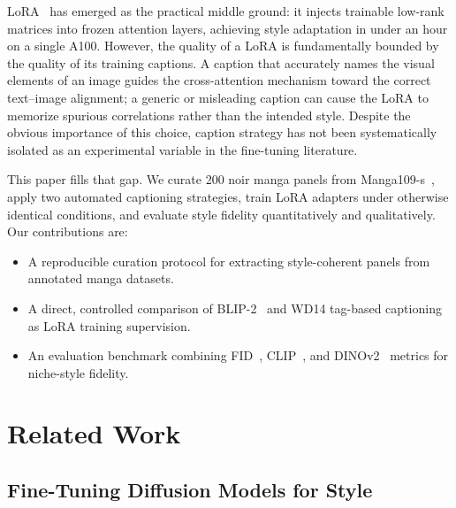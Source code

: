 \documentclass[10pt,twocolumn,letterpaper]{article}
\begin{document}
LoRA~\cite{hu2021lora} has emerged as the practical middle ground: it injects trainable low-rank matrices into frozen attention layers, achieving style adaptation in under an hour on a single A100.
However, the quality of a LoRA is fundamentally bounded by the quality of its training captions.
A caption that accurately names the visual elements of an image guides the cross-attention mechanism toward the correct text–image alignment; a generic or misleading caption can cause the LoRA to memorize spurious correlations rather than the intended style.
Despite the obvious importance of this choice, caption strategy has not been systematically isolated as an experimental variable in the fine-tuning literature.

This paper fills that gap.
We curate 200 noir manga panels from Manga109-s~\cite{matsui2017manga109}, apply two automated captioning strategies, train LoRA adapters under otherwise identical conditions, and evaluate style fidelity quantitatively and qualitatively.
Our contributions are:
\begin{itemize}
  \item A reproducible curation protocol for extracting style-coherent panels from annotated manga datasets.
  \item A direct, controlled comparison of BLIP-2~\cite{li2023blip2} and WD14 tag-based captioning as LoRA training supervision.
  \item An evaluation benchmark combining FID~\cite{heusel2017fid}, CLIP~\cite{radford2021clip}, and DINOv2~\cite{oquab2023dinov2} metrics for niche-style fidelity.
\end{itemize}

\section{Related Work}

\subsection{Fine-Tuning Diffusion Models for Style}
\end{document}
